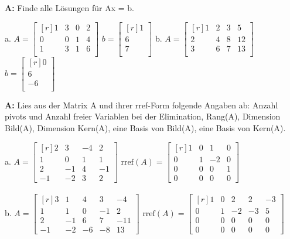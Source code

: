 \documentclass[landscape,twocolumn,a4paper]{article}
\begin{document}
\bigskip {}

\textbf{A:}   
Finde alle Lösungen für Ax = b.

a.   $A =\begin{bmatrix*}[r] 1 & 3 & 0 & 2\\  0 & 0 & 1 & 4\\ 1 & 3 & 1 & 6\\ \end{bmatrix*}$  \quad 
      $b =\begin{bmatrix*}[r] 1 \\  6\\ 7\\ \end{bmatrix*}$  \quad 
b.   $A =\begin{bmatrix*}[r] 1 & 2 & 3 & 5\\  2 & 4 & 8 & 12\\ 3 & 6 & 7 & 13\\ \end{bmatrix*}$  \quad 
      $b =\begin{bmatrix*}[r] 0 \\  6\\ -6\\ \end{bmatrix*}$  \quad 
\bigskip {}

\textbf{A:}   
Lies aus der Matrix A und ihrer rref-Form folgende Angaben ab: Anzahl pivots und Anzahl freier Variablen bei der Elimination, 
Rang(A), Dimension  Bild(A), Dimension Kern(A), eine Basis von Bild(A), eine Basis von Kern(A).

a.   $A =\begin{bmatrix*}[r] 2 & 3 & -4 & 2\\  1 & 0 & 1 & 1\\ 2 & -1 & 4 & -1\\ -1 & -2 & 3 & 2\end{bmatrix*}$  \quad 
      $\text{rref}(A) =\begin{bmatrix*}[r] 1 & 0 & 1 & 0\\  0 & 1 & -2 & 0\\ 0 & 0 & 0 & 1\\ 0 & 0 & 0 & 0\end{bmatrix*}$ 
\\  
\.
\\   
b.   $A =\begin{bmatrix*}[r] 3 & 1 & 4 & 3 & -4\\  1 & 1 & 0 & -1 & 2\\ 2 & -1 & 6 & 7 & -11\\ -1 & -2 & -6 & -8 & 13\end{bmatrix*}$  \quad 
      $\text{rref}(A) =\begin{bmatrix*}[r] 1 & 0 & 2 & 2 & -3\\  0 & 1 & -2 & -3 & 5\\ 0 & 0 & 0 & 0 & 0\\ 0 & 0 & 0 & 0 & 0\end{bmatrix*}$ 
\bigskip {}
\end{document}
